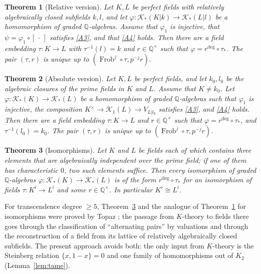 \documentclass[11pt]{amsart}
\newtheorem{thmx}{Theorem}
\theoremstyle{definition}
\theoremstyle{remark}
\newcommand{\QQ}{\mathbb{Q}}
\newcommand{\Frob}{\operatorname{Frob}}
\newcommand{\Kr}{\mathcal{K}}
\begin{document}
\begin{thmx}[Relative version]\label{thm:B}
Let $K,L$ be perfect fields with relatively algebraically closed subfields $k,l$, and let $\varphi\colon\Kr_*(K|k)\to\Kr_*(L|l)$ be a homomorphism of graded $\QQ$-algebras.
Assume that $\varphi_1$ is injective, that $\psi=\varphi_1\circ[\,\cdot\,]$ satisfies \ref{A3}, and that \ref{A4} holds.
Then there are a field embedding $\tau\colon K\to L$ with $\tau^{-1}(l)=k$ and $r\in\QQ^\times$ such that $\varphi=r^{\deg}\circ\tau_*$. The pair $(\tau,r)$ is unique up to $(\Frob^j\circ\tau,p^{-j}r)$.
\end{thmx}

\begin{thmx}[Absolute version]\label{thm:C}
Let $K,L$ be perfect fields, and let $k_0,l_0$ be the algebraic closures of the prime fields in $K$ and $L$. Assume that $K\ne k_0$.
Let $\varphi\colon\Kr_*(K)\to\Kr_*(L)$ be a homomorphism of graded $\QQ$-algebras such that $\varphi_1$ is injective, the composition $K^\times\to\Kr_1(L)\to V_{L|l_0}$ satisfies \ref{A3}, and \ref{A4} holds.
Then there are a field embedding $\tau\colon K\to L$ and $r\in\QQ^\times$ such that $\varphi=r^{\deg}\circ\tau_*$, and $\tau^{-1}(l_0)=k_0$. The pair $(\tau,r)$ is unique up to $(\Frob^j\circ\tau,p^{-j}r)$.
\end{thmx}

\begin{thmx}[Isomorphisms]\label{thm:D}
Let $K$ and $L$ be fields each of which contains three elements that are algebraically independent over the prime field; if one of them has characteristic $0$, two such elements suffice.
Then every isomorphism of graded $\QQ$-algebras $\varphi\colon\Kr_*(K)\to\Kr_*(L)$ is of the form $r^{\deg}\circ\tau_*$ for an isomorphism of fields $\tau\colon K^i\to L^i$ and some $r\in\QQ^\times$.
In particular $K^i\cong L^i$.
\end{thmx}

For transcendence degree $\ge5$, Theorem~\ref{thm:D} and the analogue of Theorem~\ref{thm:B} for isomorphisms were proved by Topaz \cite{T}; the passage from $K$-theory to fields there goes through
the classification of ``alternating pairs'' by valuations and through the reconstruction of a field from its lattice of relatively algebraically closed subfields.
The present approach avoids both: the only input from $K$-theory is the Steinberg relation $\{x,1-x\}=0$ and one family of homomorphisms out of $K_2$ (Lemma~\ref{lem:tame}).
\end{document}
